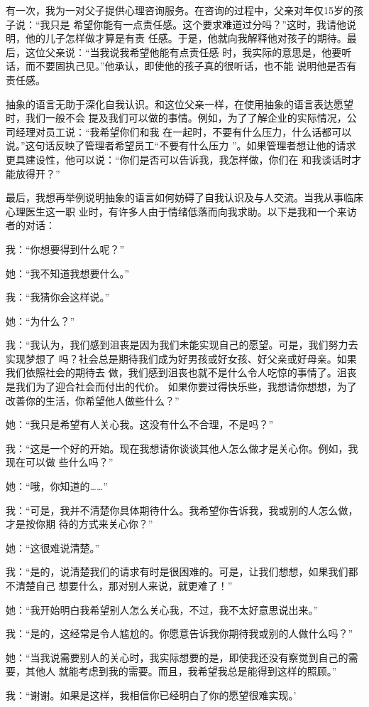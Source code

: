 \documentclass{ctexart}
\renewenvironment{quotation}{\setlength{\parskip}{0.5em}\setstretch{1.5}\kaishu\zihao{-5}\setlength{\parindent}{1em}}{\vspace{1em}}
\begin{document}
有一次，我为一对父子提供心理咨询服务。在咨询的过程中，父亲对年仅15岁的孩子说：``我只是
希望你能有一点责任感。这个要求难道过分吗？''这时，我请他说明，他的儿子怎样做才算是有责
任感。于是，他就向我解释他对孩子的期待。最后，这位父亲说：``当我说我希望他能有点责任感
时，我实际的意思是，他要听话，而不要固执己见。''他承认，即使他的孩子真的很听话，也不能
说明他是否有责任感。

抽象的语言无助于深化自我认识。和这位父亲一样，在使用抽象的语言表达愿望时，我们一般不会
提及我们可以做的事情。例如，为了了解企业的实际情况，公司经理对员工说：``我希望你们和我
在一起时，不要有什么压力，什么话都可以说。''这句话反映了管理者希望员工``不要有什么压力
''。如果管理者想让他的请求更具建设性，他可以说：``你们是否可以告诉我，我怎样做，你们在
和我谈话时才能放得开？''

最后，我想再举例说明抽象的语言如何妨碍了自我认识及与人交流。当我从事临床心理医生这一职
业时，有许多人由于情绪低落而向我求助。以下是我和一个来访者的对话：

\begin{quotation}
	我：``你想要得到什么呢？''

	她：``我不知道我想要什么。''

	我：``我猜你会这样说。''

	她：``为什么？''

	我：``我认为，我们感到沮丧是因为我们未能实现自己的愿望。可是，我们努力去实现梦想了
	吗？社会总是期待我们成为好男孩或好女孩、好父亲或好母亲。如果我们依照社会的期待去
	做，我们感到沮丧也就不是什么令人吃惊的事情了。沮丧是我们为了迎合社会而付出的代价。
	如果你要过得快乐些，我想请你想想，为了改善你的生活，你希望他人做些什么？''

	她：``我只是希望有人关心我。这没有什么不合理，不是吗？''

	我：``这是一个好的开始。现在我想请你谈谈其他人怎么做才是关心你。例如，我现在可以做
	些什么吗？''

	她：``哦，你知道的\ldots\ldots''

	我：``可是，我并不清楚你具体期待什么。我希望你告诉我，我或别的人怎么做，才是按你期
	待的方式来关心你？''

	她：``这很难说清楚。''

	我：``是的，说清楚我们的请求有时是很困难的。可是，让我们想想，如果我们都不清楚自己
	想要什么，那对别人来说，就更难了！''

	她：``我开始明白我希望别人怎么关心我，不过，我不太好意思说出来。''

	我：``是的，这经常是令人尴尬的。你愿意告诉我你期待我或别的人做什么吗？''

	她：``当我说需要别人的关心时，我实际想要的是，即使我还没有察觉到自己的需要，其他人
	就能考虑到我的需要。而且，我希望我总是能得到这样的照顾。''

	我：``谢谢。如果是这样，我相信你已经明白了你的愿望很难实现。'
\end{quotation}
\end{document}

